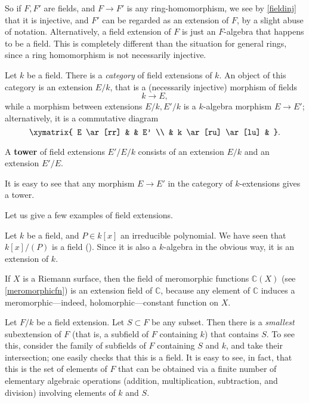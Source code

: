 So if $F, F'$ are fields, and $F \to F'$ is any ring-homomorphism, we see by 
\cref{fieldinj} that it is injective, and $F'$ can be regarded as an extension
of $F$, by a slight abuse of notation. Alternatively, a field extension of $F$
is just an $F$-algebra that happens to be a field.
This is completely different than the situation for general rings, since a
ring homomorphism is not necessarily injective. 

Let $k$ be a field. There is a \emph{category} of field extensions of $k$. 
An object of this category is an extension $E/k$, that is a
(necessarily injective) morphism of fields
\[ k \to E,  \]
while a morphism between extensions $E/k, E'/k$ is a $k$-algebra morphism $E \to E'$;
alternatively, it is a commutative diagram
\[ \xymatrix{
E \ar[rr] & & E' \\
& k \ar[ru] \ar[lu] &
}.\]


\begin{definition} 
A \textbf{tower} of field extensions $E'/E/k$ consists of an extension $E/k$
and an extension $E'/E$.
\end{definition} 

It is easy to see that any morphism $E \to E'$ in the category of
$k$-extensions gives a tower. 


Let us give a few examples of field extensions.

\begin{example} 
Let $k$ be a field, and $P \in k[x]$ an irreducible polynomial. We have seen
that $k[x]/(P)$ is a field (). Since it is also a $k$-algebra
in the obvious way, it is an extension of $k$.
\end{example} 

\begin{example} 
If $X$ is a Riemann surface, then the field of meromorphic functions
$\mathbb{C}(X)$ (see \cref{meromorphicfn}) is an extension field of
$\mathbb{C}$, because any element of $\mathbb{C}$ induces a
meromorphic---indeed, holomorphic---constant function on $X$.
\end{example} 

Let $F/k$ be a field extension. Let $S \subset F$ be any subset. 
Then there is a  \emph{smallest} subextension of $F$ (that is, a subfield of $F$ containing $k$) 
that contains $S$.
To see this, consider the family of subfields of $F $ containing $S$ and
$k$, and take their intersection; one easily checks that this is a field.
It is easy to see, in fact, that this is the set of elements of $F$ that can
be obtained via  a finite number of elementary algebraic operations
(addition, multiplication, subtraction, and division) involving elements of
$k$ and $S$.

